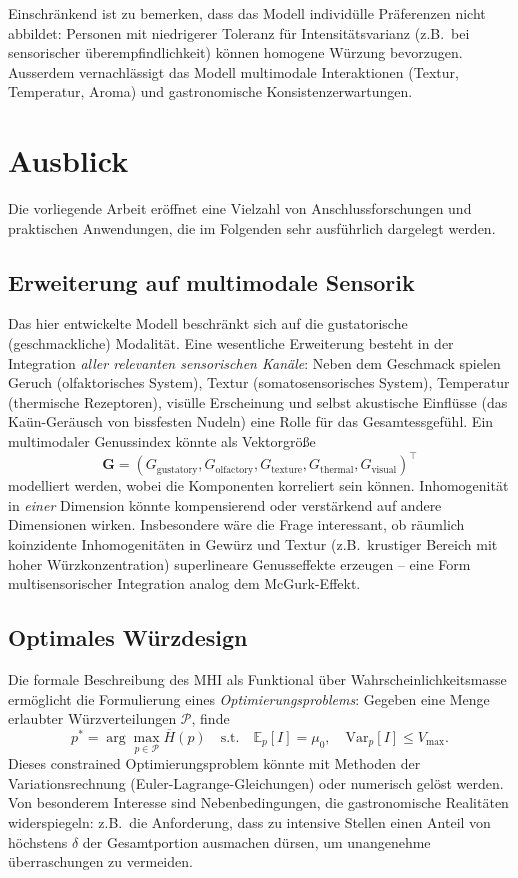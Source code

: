 ﻿\documentclass[12pt,a4paper]{article}
\theoremstyle{definition}
\newcommand{\E}{\mathbb{E}}
\newcommand{\Var}{\mathrm{Var}}
\newcommand{\MHI}{\overline{H}}
\begin{document}
Einschränkend ist zu bemerken, dass das Modell individülle Präferenzen
nicht abbildet: Personen mit niedrigerer Toleranz für Intensitätsvarianz
(z.B.\ bei sensorischer überempfindlichkeit) können homogene Würzung
bevorzugen. Ausserdem vernachlässigt das Modell multimodale Interaktionen
(Textur, Temperatur, Aroma) und gastronomische Konsistenzerwartungen.

\section{Ausblick}\label{sec:ausblick}

Die vorliegende Arbeit eröffnet eine Vielzahl von Anschlussforschungen
und praktischen Anwendungen, die im Folgenden sehr ausführlich dargelegt
werden.

\subsection{Erweiterung auf multimodale Sensorik}

Das hier entwickelte Modell beschränkt sich auf die gustatorische
(geschmackliche) Modalität. Eine wesentliche Erweiterung besteht in der
Integration \emph{aller relevanten sensorischen Kanäle}: Neben dem
Geschmack spielen Geruch (olfaktorisches System), Textur (somatosensorisches
System), Temperatur (thermische Rezeptoren), visülle Erscheinung und selbst
akustische Einflüsse (das Kaün-Geräusch von bissfesten Nudeln) eine Rolle
für das Gesamtessgefühl. Ein multimodaler Genussindex könnte als
Vektorgrö{\ss}e
\[
  \mathbf{G} = (G_{\mathrm{gustatory}}, G_{\mathrm{olfactory}}, G_{\mathrm{texture}},
               G_{\mathrm{thermal}}, G_{\mathrm{visual}})^\top
\]
modelliert werden, wobei die Komponenten korreliert sein können. Inhomogenität
in \emph{einer} Dimension könnte kompensierend oder verstärkend auf andere
Dimensionen wirken. Insbesondere wäre die Frage interessant, ob räumlich
koinzidente Inhomogenitäten in Gewürz und Textur (z.B.\ krustiger Bereich
mit hoher Würzkonzentration) superlineare Genusseffekte erzeugen --
eine Form multisensorischer Integration analog dem McGurk-Effekt.

\subsection{Optimales Würzdesign}

Die formale Beschreibung des MHI als Funktional über Wahrscheinlichkeitsmasse
ermöglicht die Formulierung eines \emph{Optimierungsproblems}: Gegeben eine
Menge erlaubter Würzverteilungen $\mathcal{P}$, finde
\[
  p^* = \arg\max_{p \in \mathcal{P}} \MHI(p)
  \quad \text{s.t.} \quad \E_p[I] = \mu_0, \quad \Var_p[I] \leq V_{\max}.
\]
Dieses constrained Optimierungsproblem könnte mit Methoden der
Variationsrechnung (Euler-Lagrange-Gleichungen) oder numerisch gelöst
werden. Von besonderem Interesse sind Nebenbedingungen, die
gastronomische Realitäten widerspiegeln: z.B.\ die Anforderung, dass
zu intensive Stellen einen Anteil von höchstens $\delta$ der Gesamtportion
ausmachen dürsen, um unangenehme überraschungen zu vermeiden.
\end{document}

